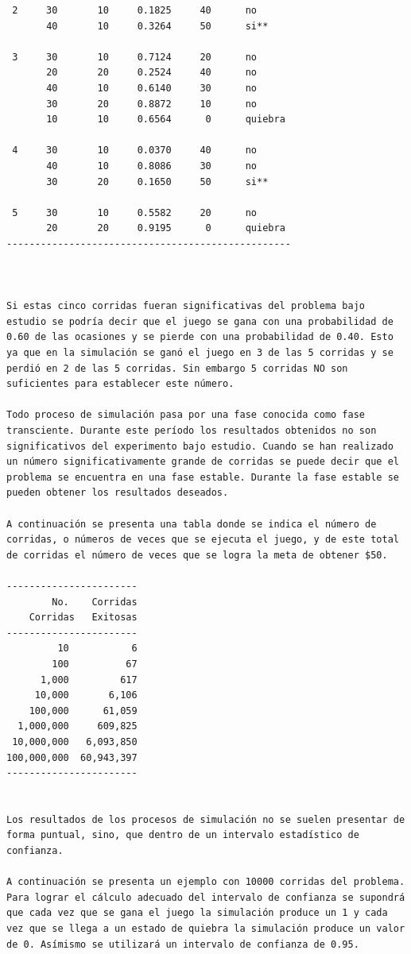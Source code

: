 \begin{verbatim}
 2     30       10     0.1825     40      no
       40       10     0.3264     50      si**

 3     30       10     0.7124     20      no
       20       20     0.2524     40      no
       40       10     0.6140     30      no
       30       20     0.8872     10      no
       10       10     0.6564      0      quiebra

 4     30       10     0.0370     40      no
       40       10     0.8086     30      no
       30       20     0.1650     50      si**

 5     30       10     0.5582     20      no
       20       20     0.9195      0      quiebra
--------------------------------------------------



Si estas cinco corridas fueran significativas del problema bajo estudio se podría decir que el juego se gana con una probabilidad de 0.60 de las ocasiones y se pierde con una probabilidad de 0.40. Esto ya que en la simulación se ganó el juego en 3 de las 5 corridas y se perdió en 2 de las 5 corridas. Sin embargo 5 corridas NO son suficientes para establecer este número.

Todo proceso de simulación pasa por una fase conocida como fase transciente. Durante este período los resultados obtenidos no son significativos del experimento bajo estudio. Cuando se han realizado un número significativamente grande de corridas se puede decir que el problema se encuentra en una fase estable. Durante la fase estable se pueden obtener los resultados deseados.

A continuación se presenta una tabla donde se indica el número de corridas, o números de veces que se ejecuta el juego, y de este total de corridas el número de veces que se logra la meta de obtener $50.

-----------------------
        No.    Corridas
    Corridas   Exitosas
-----------------------
         10           6
        100          67
      1,000         617
     10,000       6,106
    100,000      61,059
  1,000,000     609,825
 10,000,000   6,093,850
100,000,000  60,943,397
-----------------------


Los resultados de los procesos de simulación no se suelen presentar de forma puntual, sino, que dentro de un intervalo estadístico de confianza. 

A continuación se presenta un ejemplo con 10000 corridas del problema. Para lograr el cálculo adecuado del intervalo de confianza se supondrá que cada vez que se gana el juego la simulación produce un 1 y cada vez que se llega a un estado de quiebra la simulación produce un valor de 0. Asímismo se utilizará un intervalo de confianza de 0.95.



\end{verbatim}
